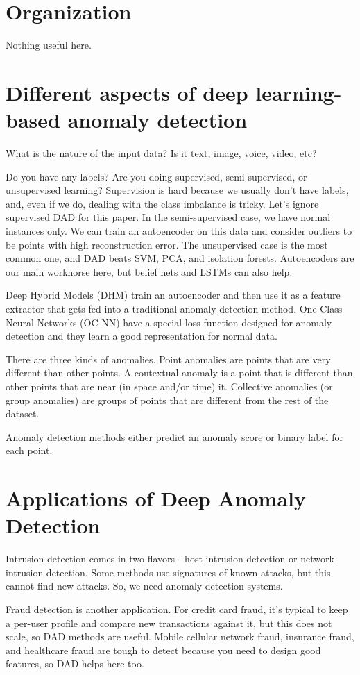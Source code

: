 \documentclass[a4paper]{article}
\begin{document}
\section{Organization}
Nothing useful here.

\section{Different aspects of deep learning-based anomaly detection}
What is the nature of the input data? Is it text, image, voice, video, etc?

Do you have any labels? Are you doing supervised, semi-supervised, or
unsupervised learning? Supervision is hard because we usually don't have labels,
and, even if we do, dealing with the class imbalance is tricky. Let's ignore
supervised DAD for this paper. In the semi-supervised case, we have normal
instances only. We can train an autoencoder on this data and consider outliers
to be points with high reconstruction error. The unsupervised case is the most
common one, and DAD beats SVM, PCA, and isolation forests. Autoencoders are our
main workhorse here, but belief nets and LSTMs can also help.

Deep Hybrid Models (DHM) train an autoencoder and then use it as a feature
extractor that gets fed into a traditional anomaly detection method. One Class
Neural Networks (OC-NN) have a special loss function designed for anomaly
detection and they learn a good representation for normal data.

There are three kinds of anomalies. Point anomalies are points that are very
different than other points. A contextual anomaly is a point that is different
than other points that are near (in space and/or time) it. Collective anomalies
(or group anomalies) are groups of points that are different from the rest of
the dataset.

Anomaly detection methods either predict an anomaly score or binary label for
each point.

\section{Applications of Deep Anomaly Detection}
Intrusion detection comes in two flavors - host intrusion detection or
network intrusion detection. Some methods use signatures of known attacks, but
this cannot find new attacks. So, we need anomaly detection systems.

Fraud detection is another application. For credit card fraud, it's typical
to keep a per-user profile and compare new transactions against it, but this does
not scale, so DAD methods are useful. Mobile cellular network fraud, insurance
fraud, and healthcare fraud are tough to detect because you need to design
good features, so DAD helps here too.
\end{document}
